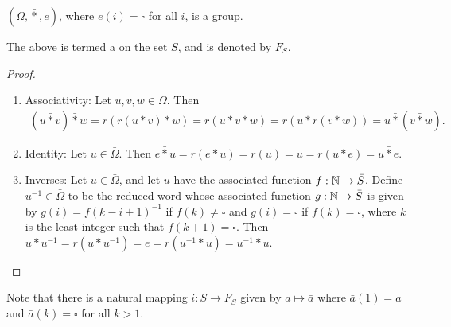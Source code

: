 \begin{theorem}
    $(\bar{\Omega},\bar{\ast},e)$, where $e(i) = \square$ for all $i$, is a group.
\end{theorem}
The above is termed a  on the set $S$, and is denoted by $F_{S}$.
\begin{proof}
    \begin{enumerate}
        \item Associativity: Let $u,v,w \in\bar{\Omega}$. Then
        \begin{align}
            (u \bar{\ast} v) \bar{\ast} w = r(r(u \ast v) \ast w) = r(u \ast v \ast w) = r(u \ast r(v \ast w)) = u \bar{\ast} (v \bar{\ast} w).
        \end{align}

        \item Identity: Let $u \in \bar{\Omega}$. Then $e \bar{\ast} u = r(e \ast u) = r(u) = u = r(u \ast e) = u \bar{\ast} e$.
        
        \item Inverses: Let $u \in \bar{\Omega}$, and let $u$ have the associated function $f:\mathbb{N} \to \bar{S}$. Define $u^{-1} \in \bar{\Omega}$ to be the reduced word whose associated function $g:\mathbb{N} \to \bar{S}$ is given by $g(i) = f(k-i+1)^{-1}$ if $f(k) \neq \square$ and $g(i) = \square$ if $f(k) = \square$, where $k$ is the least integer such that $f(k+1) = \square$. Then $u \bar{\ast} u^{-1} = r(u \ast u^{-1}) = e = r(u^{-1} \ast u) = u^{-1} \bar{\ast} u$.
    \end{enumerate}
\end{proof}

Note that there is a natural mapping $i:S \to F_{S}$ given by $a \mapsto \bar{a}$ where $\bar{a}(1) = a$ and $\bar{a}(k) = \square$ for all $k > 1$.

